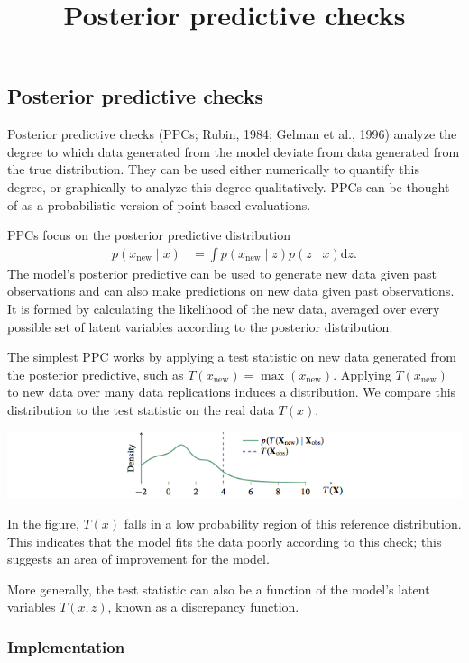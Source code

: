 \title{Posterior predictive checks}

\subsection{Posterior predictive checks}

Posterior predictive checks (PPCs; Rubin, 1984; Gelman et al., 1996)
analyze the degree to which data generated from the model deviate from
data generated from the true distribution. They can be used either
numerically to quantify this degree, or graphically to analyze this
degree qualitatively.
PPCs can be thought of as a probabilistic version of point-based
evaluations.

PPCs focus on the posterior predictive distribution
\begin{align*}
  p(x_\text{new} \mid x)
  &=
  \int
  p(x_\text{new} \mid z)
  p(z \mid x)
  \text{d} z.
\end{align*}
The model's posterior predictive can be used to generate new data
given past observations and can also make predictions on new data
given past observations.
It is formed by calculating the likelihood of the new data, averaged
over every possible set of latent variables according to the posterior
distribution.

The simplest PPC works by applying a test statistic on new data
generated from the posterior predictive, such as
$T(x_\text{new}) = \max(x_\text{new})$.  Applying $T(x_\text{new})$ to
new data over many data replications induces a distribution. We compare
this distribution to the test statistic on the real data $T(x)$.

\includegraphics{images/ppc.png}

In the figure, $T(x)$ falls in a low probability region of this
reference distribution. This indicates that the model fits the data
poorly according to this check; this suggests an area of improvement
for the model.

More generally, the test statistic can also be a function of the
model's latent variables $T(x, z)$, known as a discrepancy function.

\subsubsection{Implementation}


